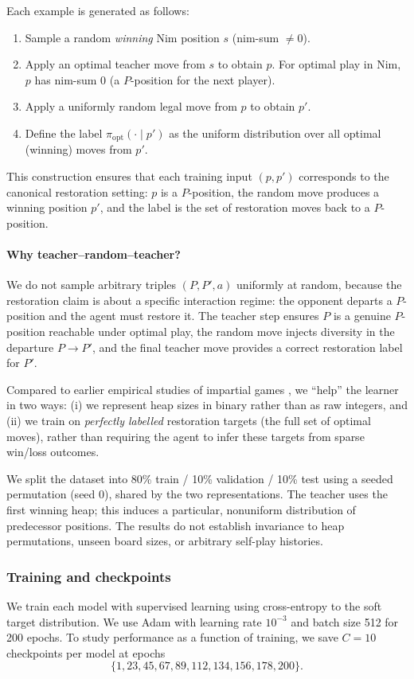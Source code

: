 \documentclass[11pt]{article}
\theoremstyle{plain}
\theoremstyle{definition}
\theoremstyle{remark}
\numberwithin{equation}{section}
\begin{document}
Each example is generated as follows:
\begin{enumerate}
  \item Sample a random \emph{winning} Nim position $s$ (nim-sum $\ne 0$).
  \item Apply an optimal teacher move from $s$ to obtain $p$.
        For optimal play in Nim, $p$ has nim-sum $0$ (a $P$-position for the next player).
  \item Apply a uniformly random legal move from $p$ to obtain $p'$.
  \item Define the label $\pi_{\mathrm{opt}}(\cdot \mid p')$ as the uniform distribution over all optimal (winning) moves from $p'$.
\end{enumerate}
This construction ensures that each training input $(p,p')$ corresponds to the canonical restoration setting:
$p$ is a $P$-position, the random move produces a winning position $p'$, and the label is the set of restoration moves back to a $P$-position.

\paragraph{Why teacher--random--teacher?}
We do not sample arbitrary triples $(P,P',a)$ uniformly at random, because the restoration claim is about a specific interaction regime: the opponent departs a $P$-position and the agent must restore it. The teacher step ensures $P$ is a genuine $P$-position reachable under optimal play, the random move injects diversity in the departure $P\to P'$, and the final teacher move provides a correct restoration label for $P'$.

Compared to earlier empirical studies of impartial games \cite{zhou2022impartial,zhou2023parity}, we ``help'' the learner in two ways:
(i) we represent heap sizes in binary rather than as raw integers, and
(ii) we train on \emph{perfectly labelled} restoration targets (the full set of optimal moves), rather than requiring the agent to infer these targets from sparse win/loss outcomes.

We split the dataset into 80\% train / 10\% validation / 10\% test using a seeded permutation (seed 0), shared by the two representations. The teacher uses the first winning heap; this induces a particular, nonuniform distribution of predecessor positions. The results do not establish invariance to heap permutations, unseen board sizes, or arbitrary self-play histories.

\subsubsection{Training and checkpoints}
We train each model with supervised learning using cross-entropy to the soft target distribution.
We use Adam with learning rate $10^{-3}$ and batch size 512 for 200 epochs.
To study performance as a function of training, we save $C=10$ checkpoints per model at epochs
\[\{1,23,45,67,89,112,134,156,178,200\}.\]
\end{document}
